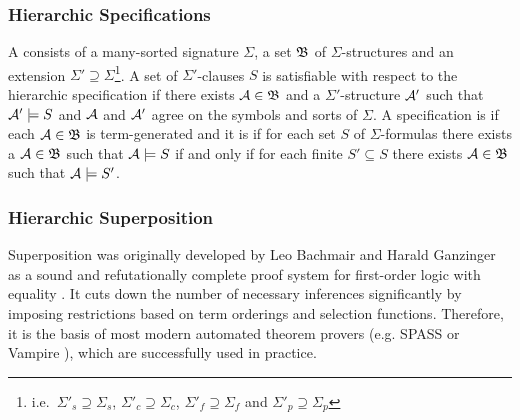 \documentclass[a4paper,twoside,notitlepage,openright,11pt]{report}
\begin{document}
\subsubsection{Hierarchic Specifications}
A  consists of a many-sorted signature $\Sigma$, a set $\mathfrak B$ of $\Sigma$-structures and an extension $\Sigma'\supseteq\Sigma$\footnote{i.e.\ $\Sigma'_s\supseteq\Sigma_s$, $\Sigma'_c\supseteq\Sigma_c$, $\Sigma'_f\supseteq\Sigma_f$ and $\Sigma'_p\supseteq\Sigma_p$}. A set of $\Sigma'$-clauses $S$ is satisfiable with respect to the hierarchic specification if there exists $\mathcal A\in\mathfrak B$ and a $\Sigma'$-structure $\mathcal A'$ such that $\mathcal A'\models S$ and $\mathcal A$ and $\mathcal A'$ agree on the symbols and sorts of $\Sigma$. A specification is  if each $\mathcal A\in\mathfrak B$ is term-generated and it is  if for each set $S$ of $\Sigma$-formulas there exists a $\mathcal A\in\mathfrak B$ such that $\mathcal A\models S$ if and only if for each finite $S'\subseteq S$ there exists $\mathcal A\in\mathfrak B$ such that $\mathcal A\models S'$.

\subsubsection{Hierarchic Superposition}
\label{sec:hiersuppos}
Superposition was originally developed by Leo Bachmair and Harald Ganzinger as a sound and refutationally complete proof system for first-order logic with equality \cite{BG90}. It cuts down the number of necessary inferences significantly by imposing restrictions based on term orderings and selection functions. Therefore, it is the basis of most modern automated theorem provers (e.g. SPASS \cite{WDFKSW09} or Vampire \cite{KV13}), which are successfully used in practice.
\end{document}

